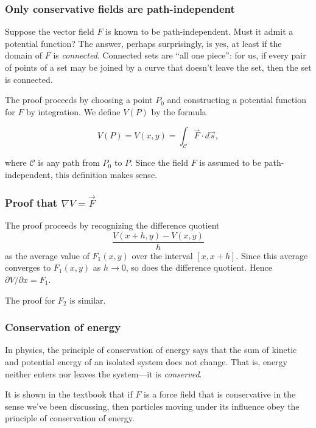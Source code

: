 \documentclass[11pt,ignorenonframetext,aspectratio=169,xcolor={svgnames}]{beamer}
\begin{document}
\begin{frame}\frametitle{Only conservative fields are path-independent}

Suppose the vector field $F$ is known to be path-independent. Must it
admit a potential function? The answer, perhaps surprisingly, is yes, at
least if the domain of $F$ is \emph{connected}. Connected sets are ``all
one piece'': for us, if every pair of points of a set may be joined by a
curve that doesn't leave the set, then the set is connected.

The proof proceeds by choosing a point $P_0$ and constructing a
potential function for $F$ by integration. We define $V(P)$ by the
formula

\[ V(P) = V(x,y) = \int_{\mathcal{C}} \vec{F} \cdot d\vec{s}, \]

where $\mathcal{C}$ is any path from $P_0$ to $P$. Since the field $F$
is assumed to be path-independent, this definition makes sense.

\end{frame}

\begin{frame}\frametitle{Proof that $\nabla V = \vec{F}$}

The proof proceeds by recognizing the difference quotient
\[ \frac{V(x+h,y) - V(x,y)}{h} \] as the average value of $F_1(x,y)$
over the interval $[x,x+h]$. Since this average converges to $F_1(x,y)$
as $h \to 0$, so does the difference quotient. Hence
$\partial V/\partial x = F_1$.

The proof for $F_2$ is similar.

\end{frame}

\begin{frame}\frametitle{Conservation of energy}

In physics, the principle of conservation of energy says that the sum of
kinetic and potential energy of an isolated system does not change. That
is, energy neither enters nor leaves the system---it is
\emph{conserved}.

It is shown in the textbook that if $F$ is a force field that is
conservative in the sense we've been discussing, then particles moving
under its influence obey the principle of conservation of energy.

\end{frame}
\end{document}

